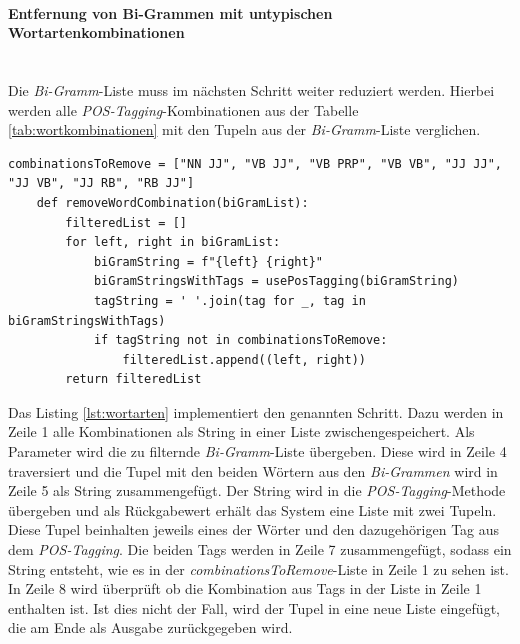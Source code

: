 \paragraph{Entfernung von Bi-Grammen mit untypischen Wortartenkombinationen}\mbox{}\\
Die \emph{Bi-Gramm}-Liste muss im nächsten Schritt weiter reduziert werden. Hierbei werden alle \emph{POS-Tagging}-Kombinationen aus der Tabelle \ref{tab:wortkombinationen} mit den Tupeln aus der \emph{Bi-Gramm}-Liste verglichen.
\begin{lstlisting}[caption={Implementation der Filterung von Wortartenkombinationen}, label=lst:wortarten]
	combinationsToRemove = ["NN JJ", "VB JJ", "VB PRP", "VB VB", "JJ JJ", "JJ VB", "JJ RB", "RB JJ"]
	def removeWordCombination(biGramList):
		filteredList = []
		for left, right in biGramList:
			biGramString = f"{left} {right}"
			biGramStringsWithTags = usePosTagging(biGramString)
			tagString = ' '.join(tag for _, tag in biGramStringsWithTags)
			if tagString not in combinationsToRemove:
				filteredList.append((left, right))
		return filteredList
\end{lstlisting}
Das Listing \ref{lst:wortarten} implementiert den genannten Schritt. Dazu werden in Zeile 1 alle Kombinationen als String in einer Liste zwischengespeichert. Als Parameter wird die zu filternde \emph{Bi-Gramm}-Liste übergeben. Diese wird in Zeile 4 traversiert und die Tupel mit den beiden Wörtern aus den \emph{Bi-Grammen} wird in Zeile 5 als String zusammengefügt. Der String wird in die \emph{POS-Tagging}-Methode übergeben und als Rückgabewert erhält das System eine Liste mit zwei Tupeln. Diese Tupel beinhalten jeweils eines der Wörter und den dazugehörigen Tag aus dem \emph{POS-Tagging}. Die beiden Tags werden in Zeile 7 zusammengefügt, sodass ein String entsteht, wie es in der \emph{combinationsToRemove}-Liste in Zeile 1 zu sehen ist. In Zeile 8 wird überprüft ob die Kombination aus Tags in der Liste in Zeile 1 enthalten ist. Ist dies nicht der Fall, wird der Tupel in eine neue Liste eingefügt, die am Ende als Ausgabe zurückgegeben wird.
